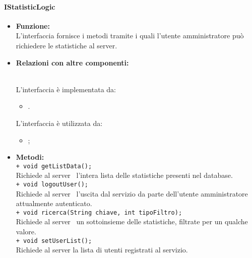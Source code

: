 {{\begin{sloppypar}
{		
		

		\paragraph{IStatisticLogic}\label{par:IStatisticLogic}{
			\begin{itemize}

				\item[] \textbf{Funzione:}\\
					L'interfaccia fornisce i metodi tramite i quali l'utente amministratore può richiedere le statistiche al server\g.\\
			
				\item[] \textbf{Relazioni con altre componenti:}{\\
					L'interfaccia è implementata da:
					\begin{itemize}
						\item[] .
					\end{itemize}
					L'interfaccia è utilizzata da:
					\begin{itemize}
						\item[] ;\\
					\end{itemize}
				}
			
				\item[] \textbf{Metodi:}{ \\
				 	\texttt{+ void getListData();}\\
					Richiede al server\g~ l'intera lista delle statistiche presenti nel database.\\
					
					\texttt{+ void logoutUser();}\\
					Richiede al server\g~ l'uscita dal servizio da parte dell'utente amministratore attualmente autenticato.\\
					
					\texttt{+ void ricerca(String chiave, int tipoFiltro);}\\
					Richiede al server\g~ un sottoinsieme delle statistiche, filtrate per un qualche valore.\\
					
					\texttt{+ void setUserList();}\\
					Richiede al server la lista di utenti registrati al servizio.\\
				}
			\end{itemize}
			}


}
\end{sloppypar}}}
